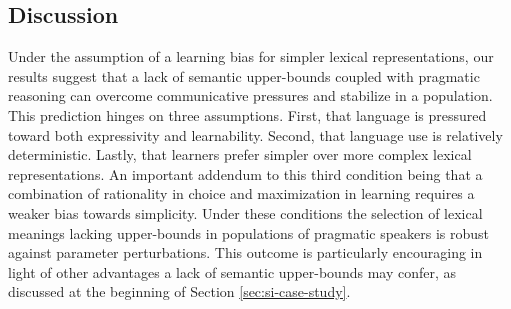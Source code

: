 \documentclass[a4paper]{article}
\begin{document}
\subsection{Discussion}
Under the assumption of a learning bias for simpler lexical representations, our results suggest that a lack of semantic upper-bounds coupled with pragmatic reasoning can overcome communicative pressures and stabilize in a population. This prediction hinges on three assumptions. First, that language is pressured toward both expressivity and learnability. Second, that language use is relatively deterministic. Lastly, that learners prefer simpler over more complex lexical representations. An important addendum to this third condition being that a combination of rationality in choice and maximization in learning requires a weaker bias towards simplicity. Under these conditions the selection of lexical meanings lacking upper-bounds in populations of pragmatic speakers is robust against parameter perturbations.  This outcome is particularly encouraging in light of other advantages a lack of semantic upper-bounds may confer, as discussed at the beginning of Section \ref{sec:si-case-study}.
\end{document}
